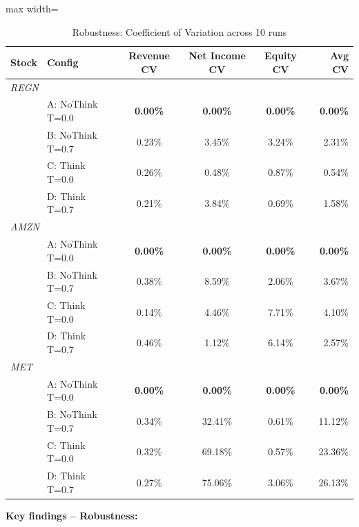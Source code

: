 \documentclass[11pt,a4paper]{article}
\begin{document}
\begin{table}[H]\centering
\caption{Robustness: Coefficient of Variation across 10 runs}
\label{tab:think_cv}
\begin{adjustbox}{max width=\textwidth}
\begin{tabular}{llcccr}\toprule
\textbf{Stock} & \textbf{Config} &
\textbf{Revenue CV} & \textbf{Net Income CV} & \textbf{Equity CV} &
\textbf{Avg CV}\\\midrule
\multicolumn{6}{l}{\textit{REGN}}\\
\rowcolor{bestgreen}
& A: NoThink T=0.0 & \textbf{0.00\%} & \textbf{0.00\%} & \textbf{0.00\%} & \textbf{0.00\%}\\
& B: NoThink T=0.7 & 0.23\%          & 3.45\%          & 3.24\%          & 2.31\%\\
& C: Think   T=0.0 & 0.26\%          & 0.48\%          & 0.87\%          & 0.54\%\\
& D: Think   T=0.7 & 0.21\%          & 3.84\%          & 0.69\%          & 1.58\%\\[4pt]
\multicolumn{6}{l}{\textit{AMZN}}\\
\rowcolor{bestgreen}
& A: NoThink T=0.0 & \textbf{0.00\%} & \textbf{0.00\%} & \textbf{0.00\%} & \textbf{0.00\%}\\
& B: NoThink T=0.7 & 0.38\%          & 8.59\%          & 2.06\%          & 3.67\%\\
& C: Think   T=0.0 & 0.14\%          & 4.46\%          &\cellcolor{badred}7.71\% & 4.10\%\\
& D: Think   T=0.7 & 0.46\%          & 1.12\%          & 6.14\%          & 2.57\%\\[4pt]
\multicolumn{6}{l}{\textit{MET}}\\
\rowcolor{bestgreen}
& A: NoThink T=0.0 & \textbf{0.00\%} & \textbf{0.00\%} & \textbf{0.00\%} & \textbf{0.00\%}\\
& B: NoThink T=0.7 & 0.34\%          & 32.41\%         & 0.61\%          & 11.12\%\\
\rowcolor{badred}
& C: Think   T=0.0 & 0.32\%          & 69.18\%         & 0.57\%          & 23.36\%\\
\rowcolor{badred}
& D: Think   T=0.7 & 0.27\%          & 75.06\%         & 3.06\%          & 26.13\%\\
\bottomrule
\end{tabular}
\end{adjustbox}
\end{table}

\textbf{Key findings -- Robustness:}
\end{document}
